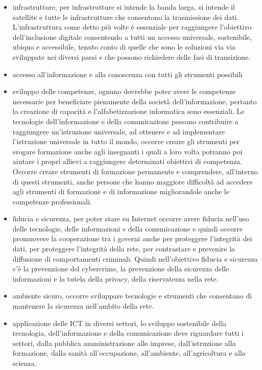 \begin{itemize}
    \item  infrastrutture, per infrastrutture si intende la banda larga, si intende il satellite e tutte le infrastrutture che consentono la trasmissione dei dati. L'infrastruttura come detto più volte è essenziale per raggiungere l'obiettivo dell'inclusione digitale consentendo a tutti un accesso universale, sostenibile, ubiquo e accessibile, tenuto conto di quelle che sono le soluzioni via via sviluppate nei diversi paesi e che possono richiedere delle fasi di transizione.
    \item accesso all'informazione e alla conoscenza con tutti gli strumenti possibili
    \item sviluppo delle competenze, ognuno dovrebbe poter avere le competenze necessarie per beneficiare pienamente della società dell'informazione, pertanto la creazione di capacità e l'alfabetizzazione informatica sono essenziali. Le tecnologie dell'informazione e della comunicazione possono contribuire a raggiungere un'istruzione universale, ad ottenere e ad implementare l'istruzione universale in tutto il mondo, occorre creare gli strumenti per erogare formazione anche agli insegnanti i quali a loro volta potranno poi aiutare i propri allievi a raggiungere determinati obiettivi di competenza. Occorre creare strumenti di formazione permanente e comprendere, all'interno di questi strumenti, anche persone che hanno maggiore difficoltà ad accedere agli strumenti di formazione e di informazione migliorandole anche le competenze professionali.
    \item fiducia e sicurezza, per poter stare su Internet occorre avere fiducia nell'uso delle tecnologie, delle informazioni e della comunicazione e quindi occorre promuovere la cooperazione tra i governi anche per proteggere l'integrità dei dati, per proteggere l'integrità della rete, per contrastare e prevenire la diffusione di comportamenti criminali. Quindi nell'obiettivo fiducia e sicurezza c'è la prevenzione del cybercrime, la prevenzione della sicurezza delle informazioni e la tutela della privacy, della riservatezza nella rete.
    \item ambiente sicuro, occorre sviluppare tecnologie e strumenti che consentano di mantenere la sicurezza nell'ambito della rete.
    \item applicazione delle ICT in diversi settori, lo sviluppo sostenibile della tecnologia, dell'informazione e della comunicazione deve riguardare tutti i settori, dalla pubblica amministrazione alle imprese, dall'istruzione alla formazione, dalla sanità all'occupazione, all'ambiente, all'agricoltura e alla scienza.

\end{itemize}

